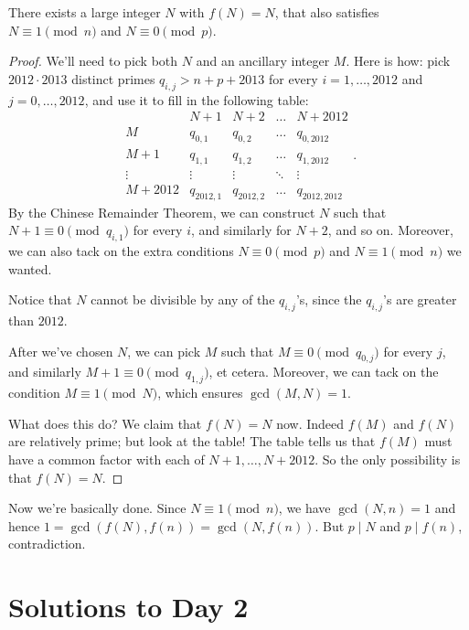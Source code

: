 \documentclass[11pt]{scrartcl}
\begin{document}
\begin{claim*}
  There exists a large integer $N$ with $f(N) = N$,
  that also satisfies $N \equiv 1 \pmod n$ and $N \equiv 0 \pmod p$.
\end{claim*}
\begin{proof}
  We'll need to pick both $N$ and an ancillary integer $M$.
  Here is how: pick $2012 \cdot 2013$ distinct primes $q_{i,j} > n+p+2013$
  for every $i=1,\dots,2012$ and $j=0,\dots,2012$,
  and use it to fill in the following table:
  \[
    \begin{array}{c|cccc}
      & N+1 & N+2 & \dots & N+2012 \\ \hline
      M & q_{0,1} & q_{0,2} & \dots & q_{0,2012} \\
      M+1 & q_{1,1} & q_{1,2} & \dots & q_{1,2012} \\
      \vdots & \vdots & \vdots & \ddots & \vdots \\
      M+2012 & q_{2012,1} & q_{2012,2} & \dots & q_{2012,2012}
    \end{array}.
  \]
  By the Chinese Remainder Theorem, we can construct $N$
  such that $N+1 \equiv 0 \pmod{q_{i,1}}$ for every $i$,
  and similarly for $N+2$, and so on.
  Moreover, we can also tack on the extra conditions
  $N \equiv 0 \pmod p$ and $N \equiv 1 \pmod n$ we wanted.

  Notice that $N$ cannot be divisible by any of the $q_{i,j}$'s,
  since the $q_{i,j}$'s are greater than $2012$.

  After we've chosen $N$, we can pick $M$ such that $M \equiv 0 \pmod{q_{0,j}}$ for every $j$,
  and similarly $M+1 \equiv 0 \pmod{q_{1,j}}$, et cetera.
  Moreover, we can tack on the condition $M \equiv 1 \pmod N$,
  which ensures $\gcd(M,N) = 1$.

  What does this do?
  We claim that $f(N) = N$ now.
  Indeed $f(M)$ and $f(N)$ are relatively prime; but look at the table!
  The table tells us that $f(M)$ must have a common factor
  with each of $N+1, \dots, N+2012$.
  So the only possibility is that $f(N) = N$.
\end{proof}

Now we're basically done.
Since $N \equiv 1 \pmod n$, we have $\gcd(N,n) = 1$
and hence $1 = \gcd(f(N), f(n)) = \gcd(N, f(n))$.
But $p \mid N$ and $p \mid f(n)$, contradiction.
\pagebreak

\section{Solutions to Day 2}
\end{document}
